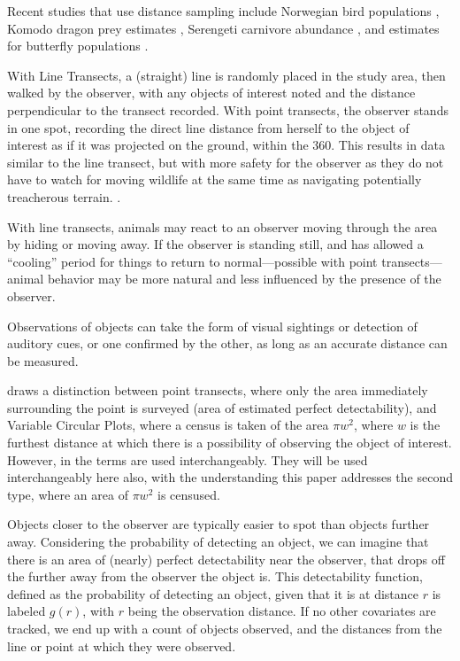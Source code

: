 \documentclass[12pt]{article}
\begin{document}
Recent studies that use distance sampling include Norwegian bird populations \parencite{pedersen2012}, Komodo dragon prey estimates \parencite{komodo2013}, Serengeti carnivore abundance \parencite{serengeti2011}, and estimates for butterfly populations \parencite{butterfly2011}. 

With Line Transects, a (straight) line is randomly placed in the study area, then walked by the observer, with any objects of interest noted and the distance perpendicular to the transect recorded. With point transects, the observer stands in one spot, recording the direct line distance from herself to the object of interest as if it was projected on the ground, within the 360\textdegree. This results in data similar to the line transect, but with more safety for the observer as they do not have to watch for moving wildlife at the same time as navigating potentially treacherous terrain. \parencite{ramsey1979}.

With line transects, animals may react to an observer moving through the area by hiding or moving away. If the observer is standing still, and has allowed a ``cooling'' period for things to return to normal---possible with point transects---animal behavior may be more natural and less influenced by the presence of the observer.

Observations of objects can take the form of visual sightings or detection of auditory cues, or one confirmed by the other, as long as an accurate distance can be measured.

\textcite{buckland2001} draws a distinction between point transects, where only the area immediately surrounding the point is surveyed (area of estimated perfect detectability), and Variable Circular Plots, where a census is taken of the area $\pi w^2$, where $w$ is the furthest distance at which there is a possibility of observing the object of interest. However, in \textcite{buckland2006, quang1993} the terms are used interchangeably. They will be used interchangeably here also, with the understanding this paper addresses the second type, where an area of $\pi w^2$ is censused.

Objects closer to the observer are typically easier to spot than objects further away. Considering the probability of detecting an object, we can imagine that there is an area of (nearly) perfect detectability near the observer, that drops off the further away from the observer the object is. This detectability function, defined as the probability of detecting an object, given that it is at distance $r$ is labeled $g(r)$, with $r$ being the observation distance. If no other covariates are tracked, we end up with a count of objects observed, and the distances from the line or point at which they were observed.
\end{document}
